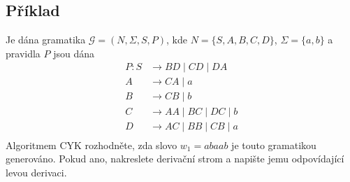 \subsection{Příklad}
Je dána gramatika $\mathcal{G} = (N, \Sigma, S, P)$, kde $N = \{S,A,B,C,D\}$, $\Sigma = \{a,b\}$ a pravidla $P$ jsou dána
\begin{align*}
  P:  S & \rightarrow BD \mid CD \mid DA \\
    A & \rightarrow CA \mid a \\
    B & \rightarrow CB \mid b \\ 
    C & \rightarrow AA \mid BC \mid DC \mid b \\
    D & \rightarrow AC \mid BB \mid CB \mid a \\
\end{align*}
Algoritmem CYK rozhodněte, zda slovo $w_1 = abaab$ je touto gramatikou generováno. Pokud ano, nakreslete derivační strom 
a napište jemu odpovídající levou derivaci.